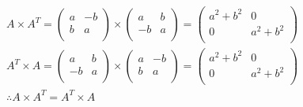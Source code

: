 \documentclass[dvipdfmx,uplatex]{jsarticle}
\begin{document}
  \begin{equation}
    \begin{aligned}
        &A \times A^{T} = \begin{pmatrix} a & -b \\ b & a \\ \end{pmatrix} \times \begin{pmatrix} a & b \\ -b & a \\ \end{pmatrix} = \begin{pmatrix} a^2 + b^2 & 0 \\ 0 & a^2 + b^2 \\ \end{pmatrix} \nonumber\\
        &A^{T} \times A = \begin{pmatrix} a & b \\ -b & a \\ \end{pmatrix} \times \begin{pmatrix} a & -b \\ b & a \\ \end{pmatrix} = \begin{pmatrix} a^2 + b^2 & 0 \\ 0 & a^2 + b^2 \\ \end{pmatrix} \nonumber\\
        & \therefore  A \times A^{T} = A^{T} \times A \nonumber\\
    \end{aligned}
  \end{equation}
\end{document}
